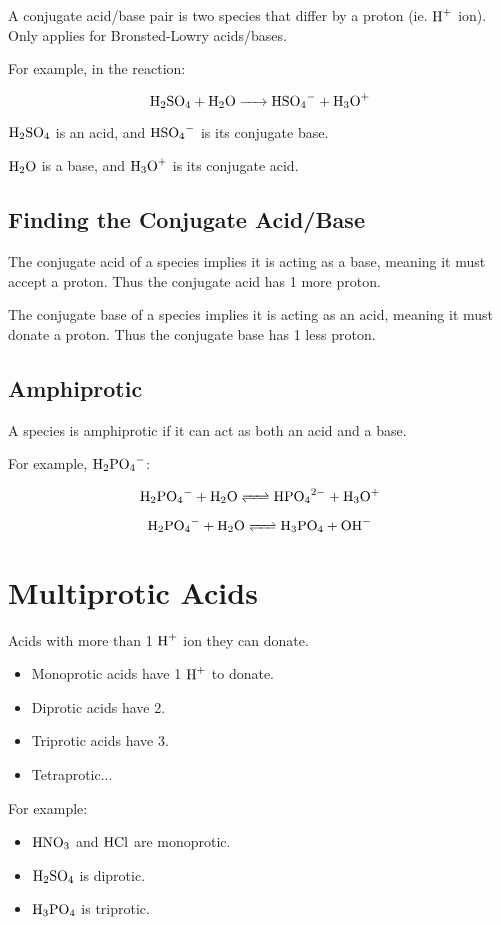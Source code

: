 \documentclass[a4paper,11pt]{article}
\begin{document}
A conjugate acid/base pair is two species that differ by a proton (ie.
$\ce{H+}$ ion). Only applies for Bronsted-Lowry acids/bases.

For example, in the reaction:

$$
\ce{H2SO4 + H2O -> HSO4- + H3O+}
$$

$\ce{H2SO4}$ is an acid, and $\ce{HSO4-}$ is its conjugate base.

$\ce{H2O}$ is a base, and $\ce{H3O+}$ is its conjugate acid.


\subsection{Finding the Conjugate Acid/Base}

The conjugate acid of a species implies it is acting as a base, meaning it must
accept a proton. Thus the conjugate acid has 1 more proton.

The conjugate base of a species implies it is acting as an acid, meaning it must
donate a proton. Thus the conjugate base has 1 less proton.


\subsection{Amphiprotic}

A species is amphiprotic if it can act as both an acid and a base.

For example, $\ce{H2PO4-}$:

$$
\ce{H2PO4- + H2O <=> HPO4^2- + H3O+}
$$

$$
\ce{H2PO4- + H2O <=> H3PO4 + OH-}
$$


\section{Multiprotic Acids}

Acids with more than 1 $\ce{H+}$ ion they can donate.

\begin{itemize}
\item Monoprotic acids have 1 $\ce{H+}$ to donate.
\item Diprotic acids have 2.
\item Triprotic acids have 3.
\item Tetraprotic...
\end{itemize}

For example:

\begin{itemize}
\item $\ce{HNO3}$ and $\ce{HCl}$ are monoprotic.
\item $\ce{H2SO4}$ is diprotic.
\item $\ce{H3PO4}$ is triprotic.
\end{itemize}
\end{document}
